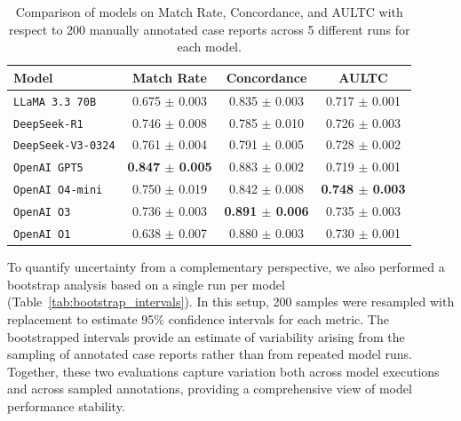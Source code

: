 \begin{table}[h!]
\centering
\caption{Comparison of models on Match Rate, Concordance, and AULTC with respect to 200 manually annotated case reports across 5 different runs for each model.}
\label{tab:model_comparison}
\begin{tabular}{lccc}
\hline
\textbf{Model} & \textbf{Match Rate} & \textbf{Concordance} & \textbf{AULTC} \\
\hline
\texttt{LLaMA 3.3 70B}       & 0.675 $\pm$ 0.003 & 0.835 $\pm$ 0.003 & 0.717 $\pm$ 0.001 \\
\texttt{DeepSeek-R1}         & 0.746 $\pm$ 0.008 & 0.785 $\pm$ 0.010 & 0.726 $\pm$ 0.003 \\
\texttt{DeepSeek-V3-0324}    & 0.761 $\pm$ 0.004 & 0.791 $\pm$ 0.005 & 0.728 $\pm$ 0.002 \\
\texttt{OpenAI GPT5}         & \textbf{0.847 $\pm$ 0.005} & 0.883 $\pm$ 0.002 & 0.719 $\pm$ 0.001 \\
\texttt{OpenAI O4-mini}      & 0.750 $\pm$ 0.019 & 0.842 $\pm$ 0.008 & \textbf{0.748 $\pm$ 0.003} \\
\texttt{OpenAI O3}           & 0.736 $\pm$ 0.003 & \textbf{0.891 $\pm$ 0.006} & 0.735 $\pm$ 0.003 \\
\texttt{OpenAI O1}           & 0.638 $\pm$ 0.007 & 0.880 $\pm$ 0.003 & 0.730 $\pm$ 0.001 \\
\hline
\end{tabular}
\end{table}

To quantify uncertainty from a complementary perspective, we also performed a bootstrap analysis based on a single run per model (Table~\ref{tab:bootstrap_intervals}). 
In this setup, 200 samples were resampled with replacement to estimate 95\% confidence intervals for each metric. 
The bootstrapped intervals provide an estimate of variability arising from the sampling of annotated case reports rather than from repeated model runs. 
Together, these two evaluations capture variation both across model executions and across sampled annotations, providing a comprehensive view of model performance stability.


